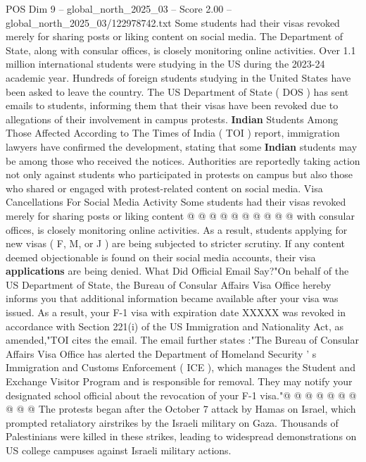 \begin{textsample}{POS Dim 9 – global\_north\_2025\_03 – Score 2.00 – global\_north\_2025\_03/122978742.txt}  \label{ex:f9_pos_295}
Some students had their visas revoked merely for sharing posts or liking content on social media.
The Department of State, along with consular offices, is closely monitoring online activities.
Over 1.1 million international students were studying in the US during the 2023-24 academic year.
Hundreds of foreign students studying in the United States have been asked to leave the country.
The US Department of State ( DOS ) has sent emails to students, informing them that their visas have been revoked due to allegations of their involvement in campus protests. \textbf{Indian} Students Among Those Affected According to The Times of India ( TOI ) report, immigration lawyers have confirmed the development, stating that some \textbf{Indian} students may be among those who received the notices.
Authorities are reportedly taking action not only against students who participated in protests on campus but also those who shared or engaged with protest-related content on social media.
Visa Cancellations For Social Media Activity Some students had their visas revoked merely for sharing posts or liking content @ @ @ @ @ @ @ @ @ @ with consular offices, is closely monitoring online activities.
As a result, students applying for new visas ( F, M, or J ) are being subjected to stricter scrutiny.
If any content deemed objectionable is found on their social media accounts, their visa \textbf{applications} are being denied.
What Did Official Email Say?"On behalf of the US Department of State, the Bureau of Consular Affairs Visa Office hereby informs you that additional information became available after your visa was issued.
As a result, your F-1 visa with expiration date XXXXX was revoked in accordance with Section 221(i) of the US Immigration and Nationality Act, as amended,"TOI cites the email.
The email further states :"The Bureau of Consular Affairs Visa Office has alerted the Department of Homeland Security ' s Immigration and Customs Enforcement ( ICE ), which manages the Student and Exchange Visitor Program and is responsible for removal.
They may notify your designated school official about the revocation of your F-1 visa."@ @ @ @ @ @ @ @ @ @ The protests began after the October 7 attack by Hamas on Israel, which prompted retaliatory airstrikes by the Israeli military on Gaza.
Thousands of Palestinians were killed in these strikes, leading to widespread demonstrations on US college campuses against Israeli military actions.

\end{textsample}
